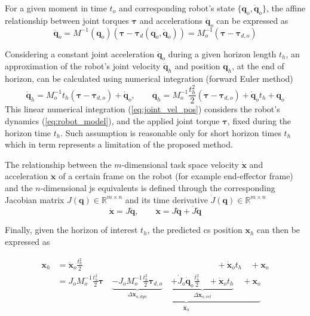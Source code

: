 For a given moment in time $t_o$ and corresponding robot's state $\{\bm{q}_o,\dot{\bm{q}}_o\}$, the affine relationship between joint torques $\bm{\tau}$ and accelerations $\ddot{\bm{q}}_{o}$ can be expressed as
\begin{equation}
    \ddot{\bm{q}}_{o} = M^{-1}(\bm{q}_o)(\bm{\tau} - \bm{\tau}_d(\bm{q}_o,\dot{\bm{q}}_o)) = M_o^{-1}(\bm{\tau} - \bm{\tau}_{d,o})
\end{equation}

Considering a constant joint acceleration $\ddot{\bm{q}}_{o}$ during a given horizon length $t_h$, an approximation of the robot's joint velocity $\dot{\bm{q}}_{h}$ and position $\bm{q}_{h}$, at the end of horizon, can be calculated using numerical integration (forward Euler method) 
\begin{equation}
    \dot{\bm{q}}_{h} = M_o^{-1}t_h(\bm{\tau} - \bm{\tau}_{d,o}) + \dot{\bm{q}}_{o}, \qquad \bm{q}_{h} = M_o^{-1}\frac{t_h^2}{2}(\bm{\tau} - \bm{\tau}_{d,o}) + \dot{\bm{q}}_{o}t_h + \bm{q}_{o}
    \label{eq:joint_vel_pos}
\end{equation}
This linear numerical integration (\ref{eq:joint_vel_pos}) considers the robot's dynamics (\ref{eq:robot_model}), and the applied joint torque $\bm{\tau}$, fixed during the horizon time $t_h$. Such assumption is reasonable only for short horizon times $t_h$ which in term represents a limitation of the proposed method.

The relationship between the $m$-dimensional task space velocity $\dot{\bm{x}}$ and acceleration $\ddot{\bm{x}}$ of a certain frame on the robot (for example end-effector frame) and the $n$-dimensional \gls{js} equivalents is defined through the corresponding Jacobian matrix $J(\bm{q})\in\mathbb{R}^{m\times n}$ and its time derivative $\dot{J}(\bm{q})\in\mathbb{R}^{m\times n}$
\begin{equation}
    \dot{\bm{x}} = J \dot{\bm{q}}, \qquad  \ddot{\bm{x}} = J \ddot{\bm{q}} + \dot{J} \dot{\bm{q}}
\end{equation}

Finally, given the horizon of interest $t_h$, the predicted \gls{cs} position $\bm{x}_{h}$ can then be expressed as

\begin{equation}
\begin{split}
    {\bm{x}}_{h} &= \ddot{\bm{x}}_o\frac{t_h^2}{2}   \qquad\qquad\qquad\qquad\qquad\qquad\qquad\qquad+\dot{\bm{x}}_ot_h \quad +\!  \bm{x}_o\\
    &=  J_o M_o^{-1}\frac{t_h^2}{2}\bm{\tau} \quad \underbrace{\underbrace{-
    J_o M_o^{-1}\frac{t_h^2}{2}\bm{\tau}_{d,o}}_{\Delta \bm{x}_{o,dyn}}  \quad \underbrace{ +\dot{J}_o \dot{\bm{q}}_o\frac{t_h^2}{2} \quad+ \dot{\bm{x}}_ot_h}_{\Delta \bm{x}_{o,vel}} \quad + \bm{x}_{o} }_{\hat{\bm{x}}_{h}}
    \end{split}
    \label{eq:pred_pos}
\end{equation}


